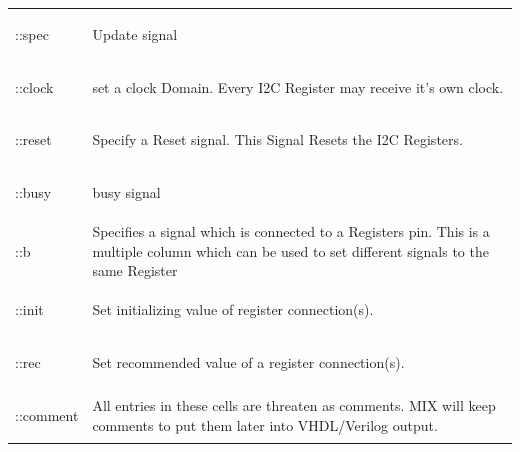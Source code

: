 \documentclass[a4paper,12pt]{report}
\begin{document}
\begin{tabular}{lp{14cm}}
  \begin{bf}::spec\end{bf} & Update signal\\
  \begin{bf}::clock\end{bf} & set a clock Domain. Every I2C Register may receive it's own clock.\\
  \begin{bf}::reset\end{bf} & Specify a Reset signal. This Signal Resets the I2C Registers.\\
  \begin{bf}::busy\end{bf} & busy signal\\
  \begin{bf}::b\end{bf} & Specifies a signal which is connected to a Registers pin. This is a multiple column which can be used to set different signals to the same Register\\
  \begin{bf}::init\end{bf} & Set initializing value of register connection(s).\\
  \begin{bf}::rec\end{bf} & Set recommended value of a register connection(s).\\
  \begin{bf}::comment\end{bf} & All entries in these cells are threaten as comments. MIX will keep comments to put them later into VHDL/Verilog output.\\
\end{tabular}
\end{document}

